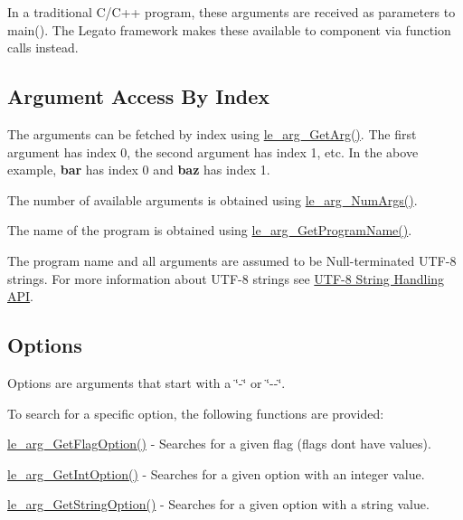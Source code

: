 

In a traditional C/\+C++ program, these arguments are received as parameters to {\ttfamily main()}. The Legato framework makes these available to component via function calls instead.\hypertarget{c_args_c_args_by_index}{}\subsection{Argument Access By Index}\label{c_args_c_args_by_index}
The arguments can be fetched by index using {\ttfamily \hyperlink{le__args_8h_a5ebca8229facd069785639cb3c1e273a}{le\+\_\+arg\+\_\+\+Get\+Arg()}}. The first argument has index 0, the second argument has index 1, etc. In the above example, {\bfseries bar} has index 0 and {\bfseries baz} has index 1.

The number of available arguments is obtained using {\ttfamily \hyperlink{le__args_8h_a6fbbeb423104e6eb92fe47ef42b7310a}{le\+\_\+arg\+\_\+\+Num\+Args()}}.

The name of the program is obtained using {\ttfamily \hyperlink{le__args_8h_add0db0cb93135a6f18f336bd7885cf75}{le\+\_\+arg\+\_\+\+Get\+Program\+Name()}}.

The program name and all arguments are assumed to be Null-\/terminated U\+T\+F-\/8 strings. For more information about U\+T\+F-\/8 strings see \hyperlink{c_utf8}{U\+T\+F-\/8 String Handling A\+P\+I}.\hypertarget{c_args_c_args_options}{}\subsection{Options}\label{c_args_c_args_options}
Options are arguments that start with a \char`\"{}-\/\char`\"{} or \char`\"{}-\/-\/\char`\"{}.

To search for a specific option, the following functions are provided\+:
\begin{DoxyItemize}
\item \hyperlink{le__args_8h_af3b6949dd9d93b8461f3bb64d565fa93}{le\+\_\+arg\+\_\+\+Get\+Flag\+Option()} -\/ Searches for a given flag (flags don\textquotesingle{}t have values).
\item \hyperlink{le__args_8h_aac66ccbb038e10c117a685d6eae5a684}{le\+\_\+arg\+\_\+\+Get\+Int\+Option()} -\/ Searches for a given option with an integer value.
\item \hyperlink{le__args_8h_af096ac39dfa56aedaa4490653891c222}{le\+\_\+arg\+\_\+\+Get\+String\+Option()} -\/ Searches for a given option with a string value.
\end{DoxyItemize}

